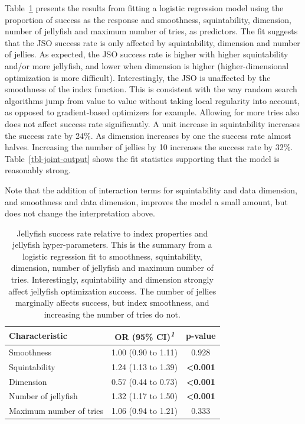 \documentclass[
  12pt,
]{interact}
\theoremstyle{plain}
\begin{document}
Table~\ref{tbl-mod-output} presents the results from fitting a logistic
regression model using the proportion of success as the response and
smoothness, squintability, dimension, number of jellyfish and maximum
number of tries, as predictors. The fit suggests that the JSO success
rate is only affected by squintability, dimension and number of jellies.
As expected, the JSO success rate is higher with higher squintability
and/or more jellyfish, and lower when dimension is higher
(higher-dimensional optimization is more difficult). Interestingly, the
JSO is unaffected by the smoothness of the index function. This is
consistent with the way random search algorithms jump from value to
value without taking local regularity into account, as opposed to
gradient-based optimizers for example. Allowing for more tries also does
not affect success rate significantly. A unit increase in squintability
increases the success rate by 24\%. As dimension increases by one the
success rate almost halves. Increasing the number of jellies by 10
increases the success rate by 32\%. Table~\ref{tbl-joint-output} shows
the fit statistics supporting that the model is reasonably strong.

Note that the addition of interaction terms for squintability and data
dimension, and smoothness and data dimension, improves the model a small
amount, but does not change the interpretation above.

\setlength{\LTpost}{0mm}

\begin{longtable}{lcc}

\caption{\label{tbl-mod-output}Jellyfish success rate relative to index
properties and jellyfish hyper-parameters. This is the summary from a
logistic regression fit to smoothness, squintability, dimension, number
of jellyfish and maximum number of tries. Interestingly, squintability
and dimension strongly affect jellyfish optimization success. The number
of jellies marginally affects success, but index smoothness, and
increasing the number of tries do not.}

\tabularnewline

\toprule
\textbf{Characteristic} & \textbf{OR} \textbf{(95\% CI)}\textsuperscript{\textit{1}} & \textbf{p-value} \\ 
\midrule\addlinespace[2.5pt]
Smoothness & 1.00 (0.90 to 1.11) & 0.928 \\ 
Squintability & 1.24 (1.13 to 1.39) & \textbf{<0.001} \\ 
Dimension & 0.57 (0.44 to 0.73) & \textbf{<0.001} \\ 
Number of jellyfish & 1.32 (1.17 to 1.50) & \textbf{<0.001} \\ 
Maximum number of tries & 1.06 (0.94 to 1.21) & 0.333 \\ 
\bottomrule

\end{longtable}
\end{document}
